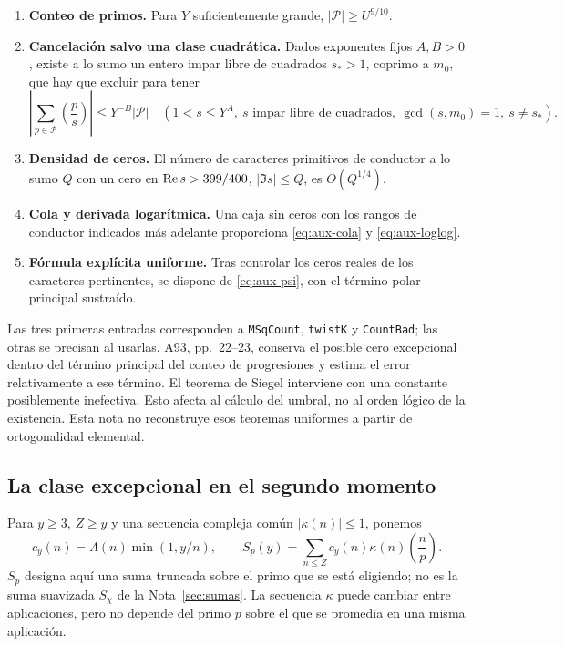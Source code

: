 \begin{enumerate}[label=\textbf{\arabic*.}]
\item \textbf{Conteo de primos.} Para $Y$ suficientemente grande,
$|\mathcal P|\ge U^{9/10}$.
\item \textbf{Cancelación salvo una clase cuadrática.} Dados exponentes
fijos $A,B>0$, existe a lo sumo un entero impar libre de cuadrados
$s_*>1$, coprimo a $m_0$, que hay que excluir para tener
\begin{equation}
 \left|\sum_{p\in\mathcal P}\left(\frac p s\right)\right|
 \le Y^{-B}|\mathcal P|
 \quad\left(1<s\le Y^A,\ s\text{ impar libre de cuadrados},\
 \gcd(s,m_0)=1,\ s\ne s_*\right).
 \label{eq:aux-cancelacion}
\end{equation}
\item \textbf{Densidad de ceros.} El número de caracteres primitivos
de conductor a lo sumo $Q$ con un cero en
$\operatorname{Re} s>399/400$, $|\Im s|\le Q$, es $O(Q^{1/4})$.
\item \textbf{Cola y derivada logarítmica.} Una caja sin ceros con
los rangos de conductor indicados más adelante proporciona
\eqref{eq:aux-cola} y \eqref{eq:aux-loglog}.
\item \textbf{Fórmula explícita uniforme.} Tras controlar los ceros
reales de los caracteres pertinentes, se dispone de
\eqref{eq:aux-psi}, con el término polar principal sustraído.
\end{enumerate}

Las tres primeras entradas corresponden a \texttt{MSqCount},
\texttt{twistK} y \texttt{CountBad}; las otras se precisan al usarlas.
A93, pp.~22--23, conserva el posible cero excepcional dentro del término
principal del conteo de progresiones y estima el error relativamente
a ese término. El teorema de Siegel interviene con una constante
posiblemente inefectiva. Esto afecta al cálculo del umbral, no al orden
lógico de la existencia. Esta nota no reconstruye esos teoremas uniformes
a partir de ortogonalidad elemental.

\subsection{La clase excepcional en el segundo momento}

Para $y\ge3$, $Z\ge y$ y una secuencia compleja común
$|\kappa(n)|\le1$, ponemos
\begin{equation}
 c_y(n)=\Lambda(n)\min(1,y/n),\qquad
 S_p(y)=\sum_{n\le Z}c_y(n)\kappa(n)\left(\frac n p\right).
 \label{eq:aux-suma-truncada}
\end{equation}
$S_p$ designa aquí una suma truncada sobre el primo que se está eligiendo;
no es la suma suavizada $S_\chi$ de la Nota~\ref{sec:sumas}.
La secuencia $\kappa$ puede cambiar entre aplicaciones, pero no depende
del primo $p$ sobre el que se promedia en una misma aplicación.

